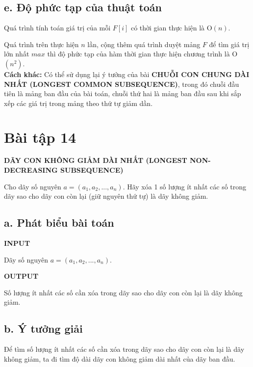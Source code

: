 \documentclass[12pt, a4paper, fleqn]{article}
\begin{document}
	\subsection*{e. Độ phức tạp của thuật toán}
	
	Quá trình tính toán giá trị của mỗi $F[i]$ có thời gian thực hiện là O$(n)$.
	
	Quá trình trên thực hiện $n$ lần, cộng thêm quá trình duyệt mảng $F$ để tìm giá trị lớn nhất $max$ thì độ phức tạp của hàm thời gian thực hiện chương trình là O$(n^2)$. \\
	
	\textbf{Cách khác:} Có thể sử dụng lại ý tưởng của bài \textbf{CHUỖI CON CHUNG DÀI NHẤT (LONGEST COMMON SUBSEQUENCE)}, trong đó chuỗi đầu tiên là mảng ban đầu của bài toán, chuỗi thứ hai là mảng ban đầu sau khi sắp xếp các giá trị trong mảng theo thứ tự giảm dần.
	
	\clearpage
	
	\section*{Bài tập 14}
	
	
	\textbf{DÃY CON KHÔNG GIẢM DÀI NHẤT (LONGEST NON-DECREASING SUBSEQUENCE)}
	
	Cho dãy số nguyên $a = (a_1, a_2, ..., a_n)$. Hãy xóa 1 số lượng ít nhất các số trong dãy sao cho dãy con còn lại (giữ nguyên thứ tự) là dãy không giảm.
	
	\subsection*{a. Phát biểu bài toán}
	
	\textbf{INPUT}
	
	Dãy số nguyên $a = (a_1, a_2, ..., a_n)$.
	
	\textbf{OUTPUT}
	
	Số lượng ít nhất các số cần xóa trong dãy sao cho dãy con còn lại là dãy không giảm.
	
	\subsection*{b. Ý tưởng giải}
	
	Để tìm số lượng ít nhất các số cần xóa trong dãy sao cho dãy con còn lại là dãy không giảm, ta đi tìm độ dài dãy con không giảm dài nhất của dãy ban đầu.
	
\end{document}
